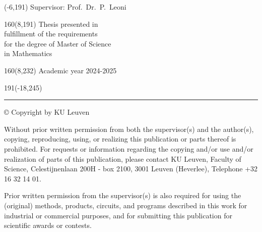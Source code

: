 \documentclass[
  12pt,
  a4paper,
  oneside]{book}
\begin{document}
%
\begin{textblock}{70}(-6,191)
\textblockcolour{}
\vspace{-\parskip}
\flushleft
Supervisor: Prof.~Dr.~P.~Leoni\\[-2pt]
\end{textblock}
%
\begin{textblock}{160}(8,191)
\textblockcolour{}
\vspace{-\parskip}
\flushright
Thesis presented in\\[4.5pt]
fulfillment of the requirements\\[4.5pt]
for the degree of Master of Science\\[4.5pt]
in Mathematics\\
\end{textblock}
%
\begin{textblock}{160}(8,232)
\textblockcolour{}
\vspace{-\parskip}
\flushright
Academic year 2024-2025
\end{textblock}
%
\begin{textblock}{191}(-18,245)
{\color{blueline}\rule{550pt}{5.5pt}}
\end{textblock}
%
\vfill
\newpage

\newpage\phantom{}

\newpage\phantom{}\vfill

© Copyright by KU Leuven

Without prior written permission from both the supervisor(s) and the author(s), copying, reproducing, using, or realizing this publication or parts thereof is prohibited. For requests or information regarding the copying and/or use and/or realization of parts of this publication, please contact KU Leuven, Faculty of Science, Celestijnenlaan 200H - box 2100, 3001 Leuven (Heverlee), Telephone +32 16 32 14 01.

Prior written permission from the supervisor(s) is also required for using the (original) methods, products, circuits, and programs described in this work for industrial or commercial purposes, and for submitting this publication for scientific awards or contests.
\end{document}
